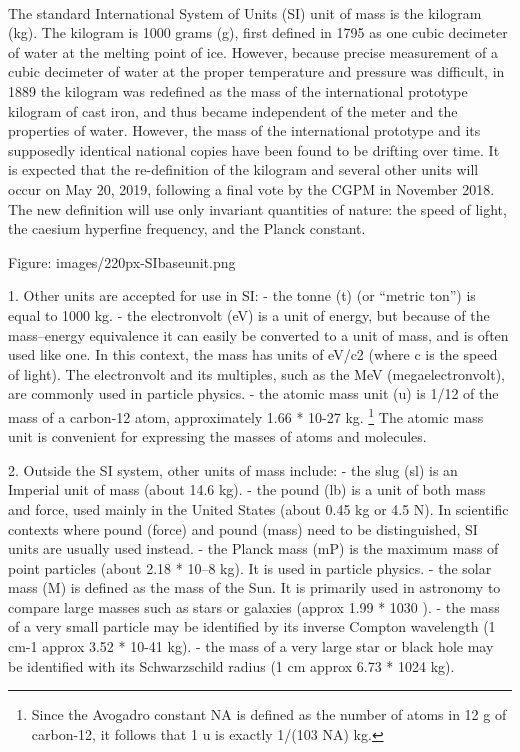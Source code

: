 \documentclass{book}
\begin{document}
	\paragraph{}
	The standard International System of Units (SI) unit of mass is the kilogram (kg). The kilogram is 1000 grams (g), first defined in 1795 as one cubic decimeter of water at the melting point of ice. However, because precise measurement of a cubic decimeter of water at the proper temperature and pressure was difficult, in 1889 the kilogram was redefined as the mass of the international prototype kilogram of cast iron, and thus became independent of the meter and the properties of water. However, the mass of the international prototype and its supposedly identical national copies have been found to be drifting over time. It is expected that the re-definition of the kilogram and several other units will occur on May 20, 2019, following a final vote by the CGPM in November 2018. The new definition will use only invariant quantities of nature: the speed of light, the caesium hyperfine frequency, and the Planck constant.
	
	Figure: images/220px-SIbaseunit.png
	
	1. Other units are accepted for use in SI:
	- the tonne (t) (or ``metric ton'') is equal to 1000 kg.
	- the electronvolt (eV) is a unit of energy, but because of the mass–energy equivalence it can easily be converted to a unit of mass, and is often used like one. In this context, the mass has units of eV/c2 (where c is the speed of light). The electronvolt and its multiples, such as the MeV (megaelectronvolt), are commonly used in particle physics.
	- the atomic mass unit (u) is 1/12 of the mass of a carbon-12 atom, approximately 1.66 * 10{-27} kg. \footnote{Since the Avogadro constant NA is defined as the number of atoms in 12 g of carbon-12, it follows that 1 u is exactly 1/(103 NA) kg.} The atomic mass unit is convenient for expressing the masses of atoms and molecules.        
	
	2. Outside the SI system, other units of mass include:
	- the slug (sl) is an Imperial unit of mass (about 14.6 kg).
	- the pound (lb) is a unit of both mass and force, used mainly in the United States (about 0.45 kg or 4.5 N). In scientific contexts where pound (force) and pound (mass) need to be distinguished, SI units are usually used instead.
	- the Planck mass (mP) is the maximum mass of point particles (about 2.18 * 10{--8} kg). It is used in particle physics.
	- the solar mass (M) is defined as the mass of the Sun. It is primarily used in astronomy to compare large masses such as stars or galaxies (approx 1.99 * 10{30} ).
	- the mass of a very small particle may be identified by its inverse Compton wavelength (1 cm{-1} approx 3.52 * 10{-41} kg).
	- the mass of a very large star or black hole may be identified with its Schwarzschild radius (1 cm approx 6.73 * 10{24} kg).
	
\end{document}
